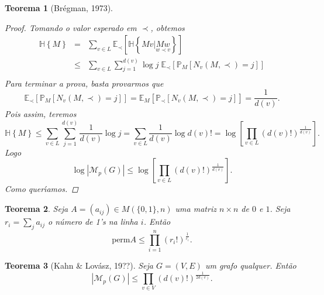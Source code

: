 \documentclass{amsart}
\theoremstyle{theorem}
\newtheorem{teorema}{Teorema}[section]
\theoremstyle{definition}
\theoremstyle{remark}
\numberwithin{equation}{section}
\newcommand{\HH}[1]{\mathbb{H}\left\{ #1 \right\}}
\newcommand{\perm}[1]{\mathrm{perm} #1}
\begin{document}
\begin{teorema}[Br\'{e}gman, 1973]
\begin{proof}
    Tomando o valor esperado em $\prec$, obtemos
    \begin{equation}
    \begin{array}{rcl}
      \HH{M} &=& \displaystyle \sum_{v\in L} \mathbb{E}_{\prec}\left[\HH{Mv\Big|\underset{w \prec v}{Mw}}\right]\\
       &\leq& \displaystyle \sum_{v\in L} \sum_{j=1}^{d(v)} \log{j} \;\mathbb{E}_{\prec}\left[\mathbb{P}_{M} \left[N_v(M,\prec) = j\right]\right]\\
    \end{array}
    \end{equation}
    Para terminar a prova, basta provarmos que 
    \begin{equation}
      \mathbb{E}_{\prec}\left[\mathbb{P}_{M} \left[N_v(M,\prec) = j\right]\right] = \mathbb{E}_{M}\left[\mathbb{P}_{\prec} \left[N_v(M,\prec) = j\right]\right] = \frac{1}{d(v)}.
    \end{equation}
    Pois assim, teremos
    \begin{equation}
      \HH{M} \leq  \sum_{v\in L} \sum_{j=1}^{d(v)}  \frac{1}{d(v)}\log{j} = \displaystyle \sum_{v\in L} \frac{1}{d(v)} \log{d(v)!} = \displaystyle \log\left[  \prod_{v\in L}(d(v)!)^{\frac{1}{d(v)}}\right].
    \end{equation}
    Logo
    \begin{equation}
      \log|\mathcal{M}_p(G)| \leq \displaystyle \log\left[  \prod_{v\in L}(d(v)!)^{\frac{1}{d(v)}}\right].
    \end{equation}
    Como quer\'{\i}amos.
  \end{proof}
\end{teorema}

\begin{teorema}
  Seja $A = (a_{ij}) \in M(\{0,1\},n)$ uma matriz $n\times n$ de $0$ e $1$. Seja $r_i = \sum_{j} a_{ij}$ o n\'{u}mero de 1's na linha $i$. Ent\~{a}o
  \begin{equation}
    \perm{A} \leq \prod_{i=1}^{n} (r_i!)^{\frac{1}{r_i}}.
  \end{equation}
\end{teorema}

\begin{teorema}[Kahn \& Lov\'{a}sz, 19??]
  Seja $G=(V,E)$ um grafo qualquer. Ent\~{a}o
  \begin{equation}
    |\mathcal{M}_{p}(G)| \leq \prod_{v \in V} (d(v)!)^{\frac{1}{2d(v)}}.
  \end{equation}
\end{teorema}
\end{document}
